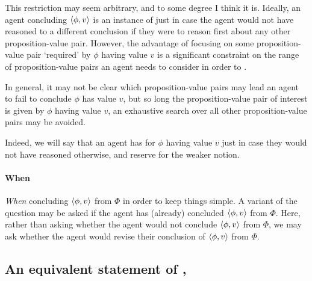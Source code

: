 \begin{note}
  This restriction may seem arbitrary, and to some degree I think it is.
  Ideally, an agent concluding \(\langle \phi, v \rangle\) is an instance of \csN{} just in case the agent would not have reasoned to a different conclusion if they were to reason first about any other proposition-value pair.
  However, the advantage of focusing on some proposition-value pair `required' by \(\phi\) having value \(v\) is a significant constraint on the range of proposition-value pairs an agent needs to consider in order to \csN{}.

  In general, it may not be clear which proposition-value pairs may lead an agent to fail to conclude \(\phi\) has value \(v\), but so long the proposition-value pair of interest is given by \(\phi\) having value \(v\), an exhaustive search over all other proposition-value pairs may be avoided.

  Indeed, we will say that an agent has \emph{\support{}} for \(\phi\) having value \(v\) just in case they would not have reasoned otherwise, and reserve \emph{\claiming{}} \support{} for the weaker notion.
\end{note}

\paragraph*{When}

\begin{note}
  \emph{When} concluding \(\langle \phi, v \rangle\) from \(\Phi\) in order to keep things simple.
  A variant of the question may be asked if the agent has (already) concluded \(\langle \phi, v \rangle\) from \(\Phi\).
  Here, rather than asking whether the agent would not conclude \(\langle \phi, v \rangle\) from \(\Phi\), we may ask whether the agent would revise their conclusion of \(\langle \phi, v \rangle\) from \(\Phi\).
\end{note}

\subsection{An equivalent statement of \zS{}, \ZS{}}
\label{sec:overview:an-equiv-stat-of-zs}


